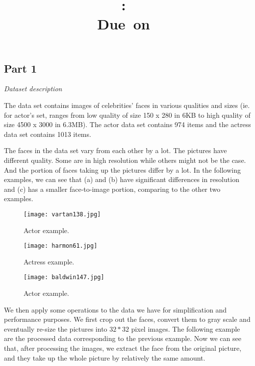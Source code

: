 \documentclass{article}
\title{
\vspace{2in}
\textmd{\textbf{\hmwkClass:\ \hmwkTitle}}\\
\normalsize\vspace{0.1in}\small{Due\ on\ \hmwkDueDate}\\
\vspace{0.1in}
\vspace{3in}
}
\author{\textbf{\hmwkAuthorName}}
\begin{document}
\begin{part1}

\maketitle

\newpage
\section{Part 1}
\noindent \textit{Dataset description}

\vspace{5mm}

The data set contains images of celebrities' faces in various qualities and sizes (ie. for actor's set, ranges from low quality of size 150 x 280 in 6KB to high quality of size 4500 x 3000 in 6.3MB). The actor data set contains 974 items and the actress data set contains 1013 items.

\vspace{5mm}

The faces in the data set vary from each other by a lot. The pictures have different quality. Some are in high resolution while others might not be the case. And the portion of faces taking up the pictures differ by a lot. In the following examples, we can see that (a) and (b) have significant differences in resolution and (c) has a smaller face-to-image portion, comparing to the other two examples. 

\begin{figure*}[!ht]
\begin{subfigure}{.35\textwidth}
  \texttt{[image: vartan138.jpg]}
  \caption{Actor example.}
  \label{fig:sfig1}
\end{subfigure}
\begin{subfigure}{.35\textwidth}
  \texttt{[image: harmon61.jpg]}
  \caption{Actress example.}
  \label{fig:sfig2}
\end{subfigure}%
\begin{subfigure}{.35\textwidth}
  \texttt{[image: baldwin147.jpg]}
  \caption{Actor example.}
  \label{fig:sfig3}
\end{subfigure}
\end{figure*}

We then apply some operations to the data we have for simplification and performance purposes. We first crop out the faces, convert them to gray scale and eventually re-size the pictures into $32 * 32$ pixel images. The following example are the processed data corresponding to the previous example. Now we can see that, after processing the images, we extract the face from the original picture, and they take up the whole picture by relatively the same amount.


\end{part1}
\end{document}
